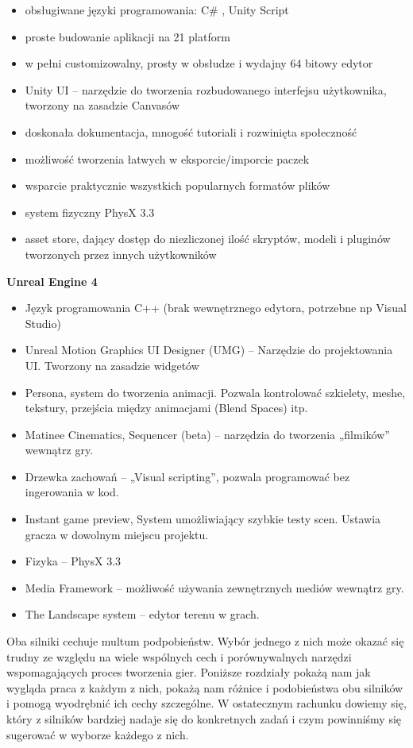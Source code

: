 \documentclass[openright]{xmgr}
\begin{document}
	\begin{itemize}
	\item obsługiwane języki programowania: C\# , Unity Script
	\item proste budowanie aplikacji na 21 platform
	\item w pełni customizowalny, prosty w obsłudze  i wydajny 64 bitowy edytor
	\item Unity UI – narzędzie do tworzenia rozbudowanego interfejsu użytkownika, tworzony na zasadzie Canvasów
	\item doskonała dokumentacja, mnogość tutoriali  i rozwinięta społeczność
	\item możliwość tworzenia łatwych w eksporcie/imporcie paczek
	\item wsparcie praktycznie wszystkich popularnych formatów plików
	\item system fizyczny PhysX 3.3
	\item asset store, dający dostęp do niezliczonej ilość skryptów, modeli i pluginów tworzonych przez innych użytkowników
\end{itemize}

\textbf{Unreal Engine 4}

	\begin{itemize}
	\item Język programowania C++ (brak wewnętrznego edytora, potrzebne np Visual Studio)
	\item Unreal Motion Graphics UI Designer (UMG) – Narzędzie do projektowania UI. Tworzony 	na zasadzie widgetów
	\item Persona, system do tworzenia animacji. Pozwala kontrolować szkielety, meshe, tekstury, 	 przejścia między animacjami (Blend Spaces) itp.
	\item Matinee Cinematics, Sequencer (beta)  – narzędzia do tworzenia „filmików” wewnątrz gry.
	\item Drzewka zachowań – „Visual scripting”, pozwala programować bez ingerowania w kod.
	\item Instant game preview, System umożliwiający szybkie testy scen. Ustawia gracza w dowolnym miejscu projektu.
	\item Fizyka – PhysX 3.3
	\item Media Framework – możliwość używania zewnętrznych mediów wewnątrz gry.
	\item The Landscape system – edytor terenu w grach.
	\end{itemize}

Oba silniki cechuje multum podpobieństw. Wybór jednego z nich może okazać się trudny ze względu na wiele wspólnych cech i porównywalnych narzędzi wspomagających proces tworzenia gier. Poniższe rozdziały pokażą nam jak wygląda praca z każdym z nich, pokażą nam różnice i podobieństwa obu silników i pomogą wyodrębnić ich cechy szczególne. W ostatecznym rachunku dowiemy się, który z silników bardziej nadaje się do konkretnych zadań i czym powinniśmy się sugerować w wyborze każdego z nich.
\end{document}
